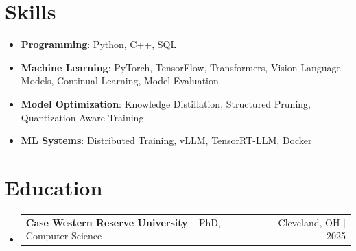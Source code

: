 \documentclass[letterpaper,13pt]{article}
\makeatletter
\newcommand{\resumeProjectHeading}[2]{
    \item
    \begin{tabular*}{\textwidth}{l@{\extracolsep{\fill}}r}
      \small#1 & #2 \\
    \end{tabular*}\vspace{-4pt}
}
\newcommand{\resumeSubHeadingListStart}{\begin{itemize}[leftmargin=0in, label={}]}
\newcommand{\resumeSubHeadingListEnd}{\end{itemize}}
\makeatother
\begin{document}
\section{Skills}
\vspace{0.02cm}
\begin{itemize}[leftmargin=0.15in, label={}, itemsep=2pt, topsep=1pt]
  \item \textbf{Programming}: Python, C++, SQL
  \item \textbf{Machine Learning}: PyTorch, TensorFlow, Transformers, Vision-Language Models, Continual Learning, Model Evaluation
  \item \textbf{Model Optimization}: Knowledge Distillation, Structured Pruning, Quantization-Aware Training
  \item \textbf{ML Systems}: Distributed Training, vLLM, TensorRT-LLM, Docker
\end{itemize}
\vspace{0.02cm}

\section{Education}
\resumeSubHeadingListStart
  \resumeProjectHeading{\textbf{Case Western Reserve University} -- PhD, Computer Science}{Cleveland, OH $|$ 2025}
\resumeSubHeadingListEnd
\end{document}
